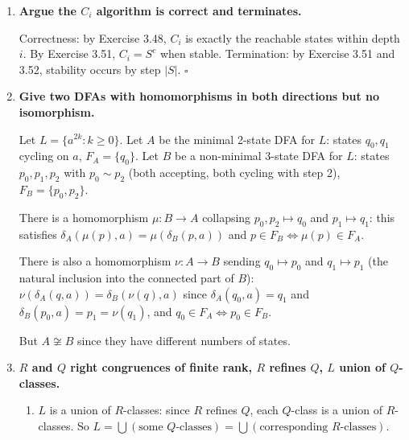 \begin{enumerate}[{3.}1.]
Each strict inclusion $C_i\subsetneq C_{i+1}$ adds at least one new state. Starting from $|C_0|=1$, after at most $|S|-1$ strict inclusions we reach $C_{|S|-1}\supseteq\cdots$, which must equal $C_{|S|}$ (no room to grow beyond $|S|$ states). So $i\leq|S|-1\leq|S|$ and $C_i=S^c$. $\square$

\item \textbf{Argue the $C_i$ algorithm is correct and terminates.}

Correctness: by Exercise 3.48, $C_i$ is exactly the reachable states within depth $i$. By Exercise 3.51, $C_i=S^c$ when stable. Termination: by Exercise 3.51 and 3.52, stability occurs by step $|S|$. $\square$

\item \textbf{Give two DFAs with homomorphisms in both directions but no isomorphism.}

Let $L = \{a^{2k} : k\geq 0\}$. Let $A$ be the minimal 2-state DFA for $L$: states $q_0, q_1$ cycling on $a$, $F_A = \{q_0\}$. Let $B$ be a non-minimal 3-state DFA for $L$: states $p_0, p_1, p_2$ with $p_0 \sim p_2$ (both accepting, both cycling with step 2), $F_B = \{p_0, p_2\}$.

There is a homomorphism $\mu: B\to A$ collapsing $p_0,p_2\mapsto q_0$ and $p_1\mapsto q_1$: this satisfies $\delta_A(\mu(p),a)=\mu(\delta_B(p,a))$ and $p\in F_B\Leftrightarrow\mu(p)\in F_A$.

There is also a homomorphism $\nu: A\to B$ sending $q_0\mapsto p_0$ and $q_1\mapsto p_1$ (the natural inclusion into the connected part of $B$): $\nu(\delta_A(q,a))=\delta_B(\nu(q),a)$ since $\delta_A(q_0,a)=q_1$ and $\delta_B(p_0,a)=p_1=\nu(q_1)$, and $q_0\in F_A\Leftrightarrow p_0\in F_B$.

But $A\not\cong B$ since they have different numbers of states.

\item \textbf{$R$ and $Q$ right congruences of finite rank, $R$ refines $Q$, $L$ union of $Q$-classes.}

\begin{enumerate}
\item $L$ is a union of $R$-classes: since $R$ refines $Q$, each $Q$-class is a union of $R$-classes. So $L=\bigcup(\text{some }Q\text{-classes})=\bigcup(\text{corresponding }R\text{-classes})$.


\end{enumerate}
\end{enumerate}
